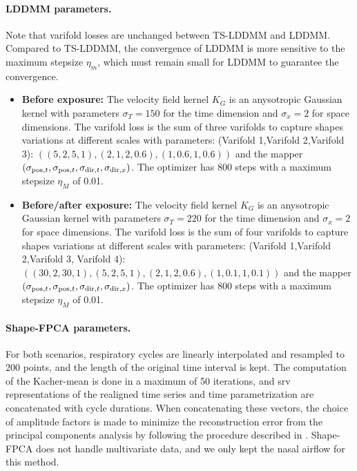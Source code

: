 \paragraph{LDDMM parameters.} Note that varifold losses are unchanged between TS-LDDMM and LDDMM. Compared to TS-LDDMM, the convergence of LDDMM is more sensitive to the maximum stepsize $\eta_m$, which must remain small for LDDMM to guarantee the convergence.
\begin{itemize}
  \item \textbf{Before exposure:} The velocity field kernel $K_G$ is an anysotropic Gaussian kernel with parameters $\sigma_{T} =150$ for the time dimension and $\sigma_x = 2$ for space dimensions. 
  The varifold loss is the sum of three varifolds to capture shapes variations at different scales with parameters: (Varifold 1,Varifold 2,Varifold 3): $\left((5,2,5,1),(2,1,2,0.6),(1,0.6,1,0.6)\right)$ and the mapper $(\sigma_{\mathrm{pos},t}, \sigma_{\mathrm{pos},t}, \sigma_{\mathrm{dir},t}, \sigma_{\mathrm{dir},x})$. The optimizer has 800 steps with a maximum stepsize $\eta_M$ of 0.01.
  \item \textbf{Before/after exposure:} The velocity field kernel $K_G$ is an anysotropic Gaussian kernel with parameters $\sigma_{T} =220$ for the time dimension and $\sigma_x = 2$ for space dimensions.
  The varifold loss is the sum of four varifolds to capture shapes variations at different scales with parameters: (Varifold 1,Varifold 2,Varifold 3, Varifold 4): $\left((30,2,30,1),(5,2,5,1),(2,1,2,0.6),(1,0.1,1,0.1)\right)$ and the mapper $(\sigma_{\mathrm{pos},t}, \sigma_{\mathrm{pos},t}, \sigma_{\mathrm{dir},t}, \sigma_{\mathrm{dir},x})$. The optimizer has 800 steps with a maximum stepsize $\eta_M$ of 0.01.
\end{itemize}

\paragraph{Shape-FPCA parameters.}
For both scenarios, respiratory cycles are linearly interpolated and resampled to 200 points, and the length of the original time interval is kept. The computation of the Kacher-mean is done in a maximum of 50 iterations, and srv representations of the realigned time series and time parametrization are concatenated with cycle durations. When concatenating these vectors, the choice of amplitude factors is made to minimize the reconstruction error from the principal components analysis by following the procedure described in \cite{wu2024shape}. Shape-FPCA does not handle multivariate data, and we only kept the nasal airflow for this method. 

